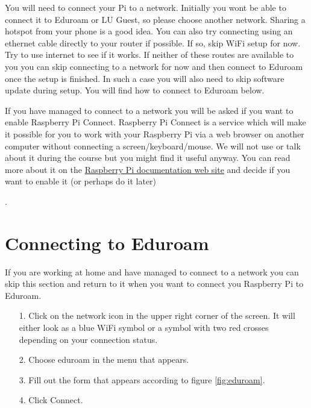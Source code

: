 \documentclass{article}
\begin{document}
\newpage

\parbox[t]{14cm}{You will need to connect your Pi to a network. Initially you wont be able to connect it to Eduroam or LU Guest, so please choose another network. Sharing a hotspot from your phone is a good idea. You can also try connecting using an ethernet cable directly to your router if possible. If so, skip WiFi setup for now.  Try to use internet to see if it works. If neither of these routes are available to you you can skip connecting to a network for now and then connect to Eduroam once the setup is finished. In such a case you will also need to skip software update during setup. You will find how to connect to Eduroam below.}

\vspace{2mm}

\parbox[t]{14cm}{If you have managed to connect to a network you will be asked if you want to enable Raspberry Pi Connect. Raspberry Pi Connect is a service which will make it possible for you to work with your Raspberry Pi via a web browser on another computer without connecting a screen/keyboard/mouse. We will not use or talk about it during the course but you might find it useful anyway. You can read more about it on the {\color{blue}\href{https://www.raspberrypi.com/documentation/services/connect.html}{Raspberry Pi documentation web site}} and decide if you want to enable it (or perhaps do it later)}.


\section{Connecting to Eduroam}

If you are working at home and have managed to connect to a network you can skip this section and return to it when you want to connect you Raspberry Pi to Eduroam.

\begin{enumerate}
    \item[1.] Click on the network icon in the upper right corner of the screen. It will either look as a blue WiFi symbol or a symbol with two red crosses depending on your connection status. 
    \item[2.] Choose eduroam in the menu that appears.
    \item[3.] Fill out the form that appears according to figure \ref{fig:eduroam}.
    \item[4.] Click Connect.
\end{enumerate}
\end{document}
